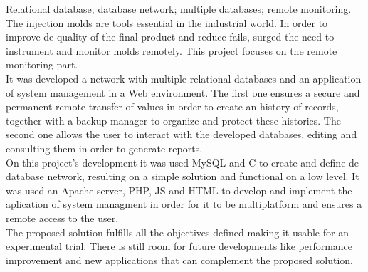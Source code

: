 \documentclass[11pt,twoside,a4paper]{report}
\begin{document}
\TitlePage
  \vspace*{55mm}
  {Relational database; database network; multiple databases; remote monitoring.}
  {The injection molds are tools essential in the industrial world. In order to improve de quality of the final product and reduce fails, surged the need to instrument and monitor molds remotely. This project focuses on the remote monitoring part.\\
  It was developed a network with multiple relational databases and an application of system management in a Web environment. The first one ensures a secure and permanent remote transfer of values in order to create an history of records, together with a backup manager to organize and protect these histories. The second one allows the user to interact with the developed databases, editing and consulting them in order to generate reports.\\
  On this project's development it was used MySQL and C to create and define de database network, resulting on a simple solution and functional on a low level. It was used an Apache server, PHP, JS and HTML to develop and implement the aplication of system managment in order for it to be multiplatform and ensures a remote access to the user.\\
  The proposed solution fulfills all the objectives defined making it usable for an experimental trial. There is still room for future developments like performance improvement and new applications that can complement the proposed solution.}
\EndTitlePage
\titlepage\ \endtitlepage %


%
%

\tableofcontents

\cleardoublepage
\listoffigures

\cleardoublepage
\listoftables



\cleardoublepage
{}
\end{document}
